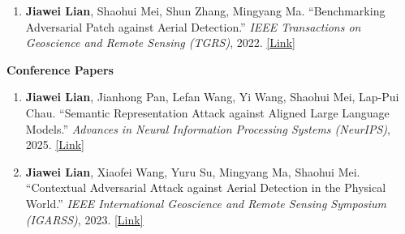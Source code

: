 \begin{enumerate}
\item \textbf{Jiawei Lian}, Shaohui Mei, Shun Zhang, Mingyang Ma. ``Benchmarking Adversarial Patch against Aerial Detection.'' \textit{IEEE Transactions on Geoscience and Remote Sensing (TGRS)}, 2022.
\href{https://ieeexplore.ieee.org/abstract/document/9965436}{[Link]}


\end{enumerate}

{\large\bfseries\sffamily\hspace{3pt}Conference Papers}
\begin{enumerate}
\item \textbf{Jiawei Lian}, Jianhong Pan, Lefan Wang, Yi Wang, Shaohui Mei, Lap-Pui Chau. ``Semantic Representation Attack against Aligned Large Language Models.'' \textit{Advances in Neural Information Processing Systems (NeurIPS)}, 2025.
\href{https://proceedings.neurips.cc/paper_files/paper/2025/hash/6958e9d0f5a76d54ff97da8c45f4d52e-Abstract-Conference.html}{[Link]}

\item \textbf{Jiawei Lian}, Xiaofei Wang, Yuru Su, Mingyang Ma, Shaohui Mei. ``Contextual Adversarial Attack against Aerial Detection in the Physical World.'' \textit{IEEE International Geoscience and Remote Sensing Symposium (IGARSS)}, 2023.
\href{https://ieeexplore.ieee.org/abstract/document/10282092}{[Link]}
\end{enumerate}



